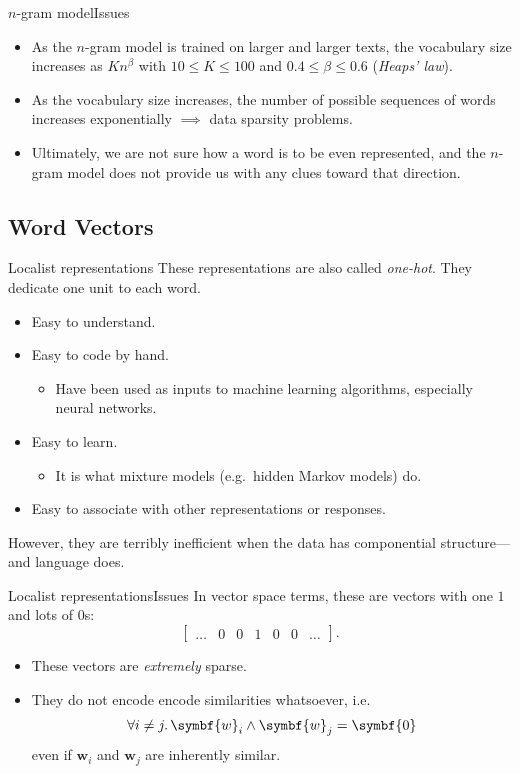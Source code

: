 \documentclass[serif, xcolor={svgnames, table}, usepdftitle=false]{beamer}
\renewcommand*{\vec}{\symbf}
\begin{document}
\begin{frame}{\(n\)-gram model}{Issues}
  \begin{itemize}
  \item As the \(n\)-gram model is trained on larger and larger texts, the
    vocabulary size increases as \(K n^{\beta}\) with \(10 \le K \le 100\) and
    \(0.4 \le \beta \le 0.6\) (\emph{Heaps' law}).
  \item As the vocabulary size increases, the number of possible sequences of
    words increases exponentially \(\implies\) data sparsity problems.
  \item Ultimately, we are not sure how a word is to be even represented, and
    the \(n\)-gram model does not provide us with any clues toward that
    direction.
  \end{itemize}
\end{frame}

\subsection{Word Vectors}

\begin{frame}{Localist representations}
  These representations are also called \emph{one-hot}.  They dedicate one unit
  to each word.
  \begin{itemize}
  \item Easy to understand.
  \item Easy to code by hand.
    \begin{itemize}
    \item Have been used as inputs to machine learning algorithms, especially
      neural networks.
    \end{itemize}
  \item Easy to learn.
    \begin{itemize}
    \item It is what mixture models (e.g.\ hidden Markov models) do.
    \end{itemize}
  \item Easy to associate with other representations or responses.
  \end{itemize}

  \alert{However}, they are terribly inefficient when the data has componential
  structure---and language does.
\end{frame}

\begin{frame}{Localist representations}{Issues}
  In vector space terms, these are vectors with one \(1\) and lots of \(0\)s:
  \[
    \begin{bmatrix}
      \ldots & 0 & 0 & 1 & 0 & 0 & \ldots
    \end{bmatrix}\text{.}
  \]
  \begin{itemize}
  \item These vectors are \emph{extremely} sparse.
  \item They do not encode encode similarities whatsoever, i.e.
    \[
      \forall i \ne j\ldotp \vec{w}_i \wedge \vec{w}_j = \vec{0}
    \]
    even if \(\vec{w}_i\) and \(\vec{w}_j\) are inherently similar.
  \end{itemize}
\end{frame}
\end{document}
